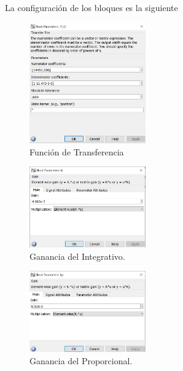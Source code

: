 \documentclass[a4paper]{IEEEtran} %
\begin{document}
La configuración de los bloques es la siguiente

\begin{figure}[h]
    \centering
        \includegraphics[width=5cm]{images/9}
        \caption{Función de Transferencia}
        \label{fig:config1}
\end{figure}


\begin{figure}[h]
    \centering
        \includegraphics[width=5cm]{images/10}
        \caption{Ganancia del Integrativo.}
        \label{fig:config2}
\end{figure}

\begin{figure}[h]
    \centering
        \includegraphics[width=5cm]{images/11}
        \caption{Ganancia del Proporcional.}
        \label{fig:config3}
\end{figure}
\end{document}
